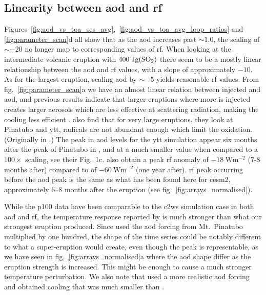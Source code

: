 \documentclass{ametsocV6.1}
\newcommand{\iso}[1][i]{{#1}njected \ce{SO2}}
\begin{document}
\subsection{Linearity between \gls{aod} and \gls{rf}}

Figures~\ref{fig:aod_vs_toa_ses_avg},~\ref{fig:aod_vs_toa_avg_loop_ratios} and
\ref{fig:parameter_scan}d all show that as the \gls{aod} increases past \(\sim 1.0\),
the scaling of \(\sim -20\) no longer map to corresponding values of \gls{rf}. When
looking at the intermediate volcanic eruption with \(\SI{400}{\tera\gram(\ce{SO2})}\)
there seem to be a mostly linear relationship between the \gls{aod} and \gls{rf} values,
with a slope of approximately \(-10\). As for the largest eruption, scaling \gls{aod} by
\(\sim-5\) yields reasonable \gls{rf} values. From fig.~\ref{fig:parameter_scan}a we
have an almost linear relation between \iso{} and \gls{aod}, and previous results
indicate that larger eruptions where more  is injected creates larger aerosols
which are less effective at scattering radiation, making the cooling less efficient
\citep{english2013,timmreck2010,timmreck2018}. \citet{timmreck2010} also find that for
very large eruptions, they look at Pinatubo and \gls{ytt},  radicals are not
abundant enough which limit the  oxidation. (Originally in \citep{bekki1995}.)
The peak in \gls{aod} levels for the \gls{ytt} simulation appear six months after the
peak of Pinatubo in \citet{timmreck2010}, and at a much smaller value when compared to a
\(100\times\) scaling, see their Fig.\ 1c. \citet{timmreck2010} also obtain a peak
\gls{rf} anomaly of \(\SI{-18}{\watt\metre^{-2}}\) (\(7\)-\(8\) months after) compared
to \citet{jones2005} of \(\SI{-60}{\watt\metre^{-2}}\) (one year after). \gls{rf} peak
occurring before the \gls{aod} peak is the same as what has been found here for
\gls{cesm2}, approximately \(6\)--\(8\) months after the eruption (see
fig.~\ref{fig:arrays_normalised}).

While the \gls{p100} data have been comparable to the \gls{c2ws} simulation case in both
\gls{aod} and \gls{rf}, the temperature response reported by \citet{jones2005} is much
stronger than what our strongest eruption produced. Since \citet{jones2005} used the
\gls{aod} forcing from Mt.\ Pinatubo multiplied by one hundred, the shape of the time
series could be notably different to what a super-eruption would create, even though the
peak is representable, as we have seen in fig.~\ref{fig:arrays_normalised}a where the
\gls{aod} shape differ as the eruption strength is increased. This might be enough to
cause a much stronger temperature perturbation. We also note that \citet{timmreck2010}
used a more realistic \gls{aod} forcing and obtained cooling that was much smaller than
\citet{jones2005}.
\end{document}
